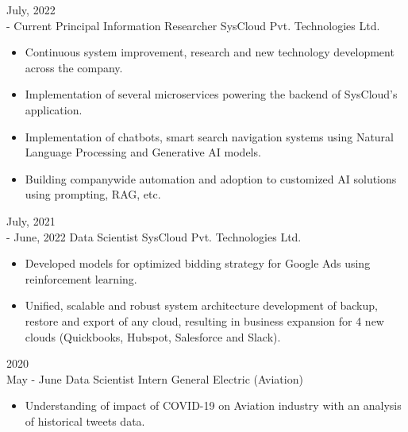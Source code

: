 \documentclass[9pt]{developercv} %
\begin{document}
\begin{entrylist}
    \entry
    {July, 2022\\ - Current}
    {Principal Information Researcher}
    {SysCloud Pvt. Technologies Ltd.}
    {\vspace{-10pt}\small
        \begin{itemize}[noitemsep,topsep=0pt,parsep=0pt,partopsep=0pt, leftmargin=-1pt]
            \item Continuous system improvement, research and new technology development across the company.
            \item Implementation of several microservices powering the backend of SysCloud's application.
            \item Implementation of chatbots, smart search navigation systems using Natural Language Processing and Generative AI models.
            \item Building companywide automation and adoption to customized AI solutions using prompting, RAG, etc.
        \end{itemize}
    }
    \entry
    {July, 2021\\- June, 2022}
    {Data Scientist}
    {SysCloud Pvt. Technologies Ltd.}
    {\vspace{-10pt}\small
        \begin{itemize}[noitemsep,topsep=0pt,parsep=0pt,partopsep=0pt, leftmargin=-1pt]
            \item Developed models for optimized bidding strategy for Google Ads using reinforcement learning.
            \item Unified, scalable and robust system architecture development of backup, restore and export of any cloud, resulting in business expansion for 4 new clouds (Quickbooks, Hubspot, Salesforce and Slack).
        \end{itemize}
    }
    \entry
    {2020\\\footnotesize{May - June}}
    {Data Scientist Intern}
    {General Electric (Aviation)}
    {\vspace{-10pt}\small
        \begin{itemize}[noitemsep,topsep=0pt,parsep=0pt,partopsep=0pt, leftmargin=-1pt]
            \item Understanding of impact of COVID-19 on Aviation industry with an analysis of historical tweets data.

\end{itemize}}
\end{entrylist}
\end{document}
